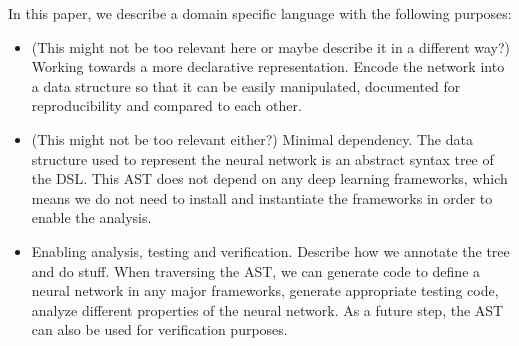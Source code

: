 In this paper, we describe a domain specific language with the following purposes:
\begin{itemize}
\item (This might not be too relevant here or maybe describe it in a
  different way?) Working towards a more declarative
  representation. Encode the network into a data structure so that it
  can be easily manipulated, documented for reproducibility and
  compared to each other.
\item (This might not be too relevant either?) Minimal dependency. The
  data structure used to represent the neural network is an abstract
  syntax tree of the DSL. This AST does not depend on any deep
  learning frameworks, which means we do not need to install and
  instantiate the frameworks in order to enable the analysis.
\item Enabling analysis, testing and verification. Describe how we
  annotate the tree and do stuff. When traversing the AST, we can
  generate code to define a neural network in any major frameworks,
  generate appropriate testing code, analyze different properties of
  the neural network. As a future step, the AST can also be used for
  verification purposes.
\end{itemize}






